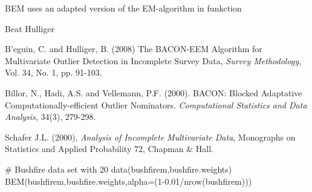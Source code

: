 %
\begin{Note}\relax
 BEM uses an adapted version of the EM-algorithm in funkction 
\end{Note}
%
\begin{Author}\relax
Beat Hulliger
\end{Author}
%
\begin{References}\relax
B\bsl{}'eguin, C. and Hulliger, B. (2008) The BACON-EEM Algorithm for Multivariate Outlier Detection 
in Incomplete Survey Data, \emph{Survey Methodology}, Vol. 34, No. 1, pp. 91-103.

Billor, N., Hadi, A.S. and Vellemann, P.F. (2000). BACON: Blocked
Adaptative Computationally-efficient Outlier Nominators. \emph{Computational Statistics and Data Analysis}, 
34(3), 279-298.

Schafer J.L. (2000),
\emph{Analysis of Incomplete Multivariate Data}, Monographs on Statistics and Applied Probability 72,
Chapman \& Hall.

\end{References}
%
\begin{Examples}
\begin{ExampleCode}
# Bushfire data set with 20%
data(bushfirem,bushfire.weights)
BEM(bushfirem,bushfire.weights,alpha=(1-0.01/nrow(bushfirem)))
\end{ExampleCode}
\end{Examples}

